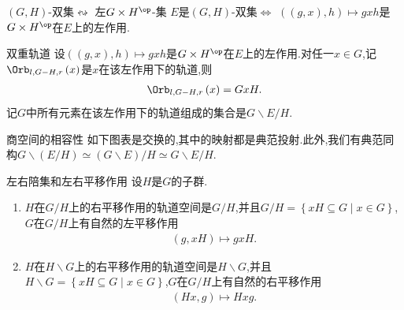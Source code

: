 \begin{proposition}{$\left(G,H\right)$-双集$\leftrightsquigarrow$ 左$G\times H^{\op}$-集}{}
	$E$是$\left(G,H\right)$-双集$\iff$ $\left(\left(g,x\right),h\right)\mapsto gxh$是$G\times H^{\op}$在$E$上的左作用.
\end{proposition}

\begin{proposition}{双重轨道}{}
	设$\left(\left(g,x\right),h\right)\mapsto gxh$是$G\times H^{\op}$在$E$上的左作用.对任一$x\in G$,记$\Orb_{l,G-H,r}\left(x\right)$是$x$在该左作用下的轨道,则
	\begin{align*}
		\Orb_{l,G-H,r}\left(x\right)=GxH.
	\end{align*}
	记$G$中所有元素在该左作用下的轨道组成的集合是$G\backslash E/H$.
\end{proposition}

\begin{proposition}{商空间的相容性}{}
	如下图表是交换的,其中的映射都是典范投射.此外,我们有典范同构$G\backslash\left(E/H\right)\simeq\left(G\backslash E\right)/H\simeq G\backslash E/H$.
	\begin{center}
	\end{center}
\end{proposition}

\begin{proposition}{左右陪集和左右平移作用}{}
	设$H$是$G$的子群.
	\begin{enumerate}
		\item $H$在$G/H$上的右平移作用的轨道空间是$G/H$,并且$G/H=\left\{xH\subseteq G\middle|x\in G\right\}$,$G$在$G/H$上有自然的左平移作用
		\begin{align*}
			\left(g,xH\right)\mapsto gxH.
		\end{align*}
		\item $H$在$H\backslash G$上的右平移作用的轨道空间是$H\backslash G$,并且$H\backslash G=\left\{xH\subseteq G\middle|x\in G\right\}$,$G$在$G/H$上有自然的右平移作用
		\begin{align*}
			\left(Hx,g\right)\mapsto Hxg.
		\end{align*}
	\end{enumerate}
\end{proposition}

